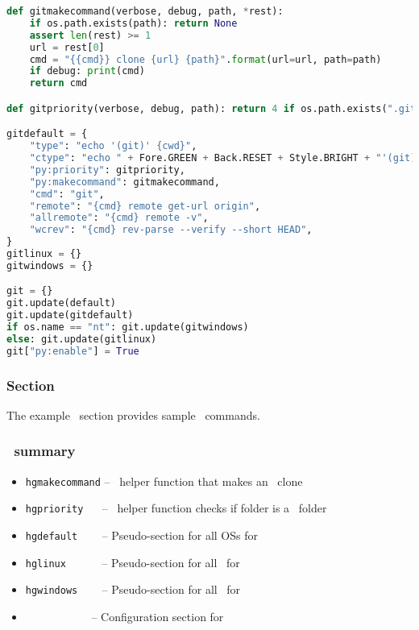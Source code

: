 \begin{snugshade}
\begin{lstlisting}[language=python]
def gitmakecommand(verbose, debug, path, *rest):
	if os.path.exists(path): return None
	assert len(rest) >= 1
	url = rest[0]
	cmd = "{{cmd}} clone {url} {path}".format(url=url, path=path)
	if debug: print(cmd)
	return cmd

def gitpriority(verbose, debug, path): return 4 if os.path.exists(".git") else 0

gitdefault = {
	"type": "echo '(git)' {cwd}",
	"ctype": "echo " + Fore.GREEN + Back.RESET + Style.BRIGHT + "'(git)'" + Fore.RESET + " {cwd}",
	"py:priority": gitpriority,
	"py:makecommand": gitmakecommand,
	"cmd": "git",
	"remote": "{cmd} remote get-url origin",
	"allremote": "{cmd} remote -v",
	"wcrev": "{cmd} rev-parse --verify --short HEAD",
}
gitlinux = {}
gitwindows = {}

git = {}
git.update(default)
git.update(gitdefault)
if os.name == "nt": git.update(gitwindows)
else: git.update(gitlinux)
git["py:enable"] = True
\end{lstlisting}
\end{snugshade}

\subsubsection{Section \hg}

The example \hg\ section provides sample \hg\ commands.

\subsubsection*{\hg\ summary}

\begin{itemize}
\item \lstinline{hgmakecommand} -- \Python\ helper function that makes an \hg\ clone
\item \lstinline{hgpriority} ~~ -- \Python\ helper function checks if folder is a \hg\ folder
\item \lstinline{hgdefault} ~~~ -- Pseudo-section for all OSs for \hg
\item \lstinline{hglinux} ~~~~~ -- Pseudo-section for all \Linux\ for \hg
\item \lstinline{hgwindows} ~~~ -- Pseudo-section for all \Windows\ for \hg
\item \hg\ ~~~~~~~~~~ -- Configuration section for \hg
\end{itemize}


